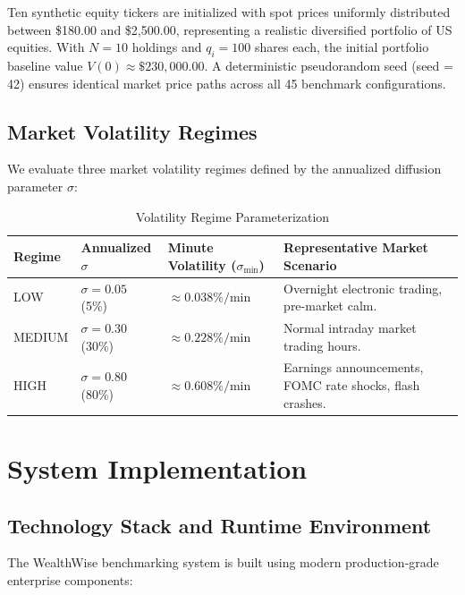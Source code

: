 \documentclass[11pt,a4paper]{article}
\begin{document}
Ten synthetic equity tickers are initialized with spot prices uniformly distributed between \$180.00 and \$2{,}500.00, representing a realistic diversified portfolio of US equities. With $N=10$ holdings and $q_i = 100$ shares each, the initial portfolio baseline value $V(0) \approx \$230{,}000.00$. A deterministic pseudorandom seed (seed = 42) ensures identical market price paths across all 45 benchmark configurations.

\subsection{Market Volatility Regimes}

We evaluate three market volatility regimes defined by the annualized diffusion parameter $\sigma$:

\begin{table}[htbp]
\centering
\caption{Volatility Regime Parameterization}
\label{tab:regimes}
\small
\begin{tabular}{llll}
\toprule
\textbf{Regime} & \textbf{Annualized $\sigma$} & \textbf{Minute Volatility ($\sigma_{\text{min}}$)} & \textbf{Representative Market Scenario} \\
\midrule
LOW    & $\sigma = 0.05$ (5\%)  & $\approx 0.038\% / \text{min}$ & Overnight electronic trading, pre-market calm. \\
MEDIUM & $\sigma = 0.30$ (30\%) & $\approx 0.228\% / \text{min}$ & Normal intraday market trading hours. \\
HIGH   & $\sigma = 0.80$ (80\%) & $\approx 0.608\% / \text{min}$ & Earnings announcements, FOMC rate shocks, flash crashes. \\
\bottomrule
\end{tabular}
\end{table}

\section{System Implementation}
\label{sec:impl}

\subsection{Technology Stack and Runtime Environment}

The WealthWise benchmarking system is built using modern production-grade enterprise components:
\end{document}

